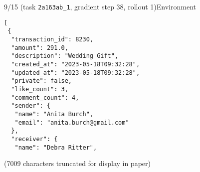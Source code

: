 \hspace*{8mm}%
\begin{minipage}{0.95\linewidth}
\begin{user_message_box}{{9/15 (task \texttt{2a163ab\_1}, gradient step 38, rollout 1)\hfill Environment}}
\scriptsize
\begin{Verbatim}[breaklines]
[
 {
  "transaction_id": 8230,
  "amount": 291.0,
  "description": "Wedding Gift",
  "created_at": "2023-05-18T09:32:28",
  "updated_at": "2023-05-18T09:32:28",
  "private": false,
  "like_count": 3,
  "comment_count": 4,
  "sender": {
   "name": "Anita Burch",
   "email": "anita.burch@gmail.com"
  },
  "receiver": {
   "name": "Debra Ritter",
\end{Verbatim}
(7009 characters truncated for display in paper)\end{user_message_box}
\end{minipage}

